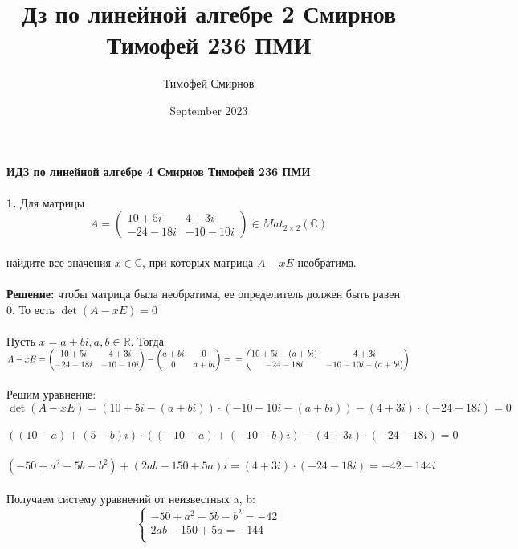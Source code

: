 \documentclass[a4paper, 12pt]{article}
\title{Дз по линейной алгебре 2 Смирнов Тимофей 236 ПМИ}
\author{Тимофей Смирнов}
\date{September 2023}
\begin{document}
    {\center \bf \large ИДЗ по линейной алгебре 4 Смирнов Тимофей 236 ПМИ}
    \\
    \\ \textbf{1.} Для матрицы
    \[
        A = \begin{pmatrix}10 + 5i & 4 + 3i \\ -24 - 18i & -10 - 10i\end{pmatrix} \in Mat_{2 \times 2} (\mathbb{C})
    \]
    \\ найдите все значения $x \in \mathbb{C}$, при которых матрица $A - xE$ необратима.
    \\
    \\ \textbf{Решение: } чтобы матрица была необратима, ее определитель должен быть равен 0. То есть $\det (A - xE) = 0$
    \\
    \\ Пусть $x = a + bi, a, b \in \mathbb{R}$. Тогда $A - xE = \begin{pmatrix}10 + 5i & 4 + 3i \\ -24 - 18i & -10 - 10i\end{pmatrix} - \begin{pmatrix}a + bi & 0 \\ 0 & a + bi\end{pmatrix} = 
    \\ = \begin{pmatrix}10 + 5i - (a + bi) & 4 + 3i \\ -24 - 18i & -10 - 10i - (a + bi)\end{pmatrix}$
    \\
    \\ Решим уравнение:
    \\ $\det (A - xE) = (10 + 5i - (a + bi)) \cdot (-10 - 10i - (a + bi)) - (4 + 3i) \cdot (-24 - 18i) = 0$
    \\
    \\ $((10 - a) + (5 - b)i) \cdot ((-10 - a) + (-10 - b)i) - (4 + 3i) \cdot (-24 - 18i) = 0$
    \\
    \\ $(-50 + a^2 - 5b - b^2) + (2ab - 150 + 5a)i = (4 + 3i) \cdot (-24 - 18i) = -42 - 144 i$
    \\
    \\ Получаем систему уравнений от неизвестных a, b:
    \begin{equation*}
        \begin{cases}
            -50 + a^2 - 5b - b^2 = -42 \\
            2ab - 150 + 5a = - 144 \\
        \end{cases}
    \end{equation*}
\end{document}
